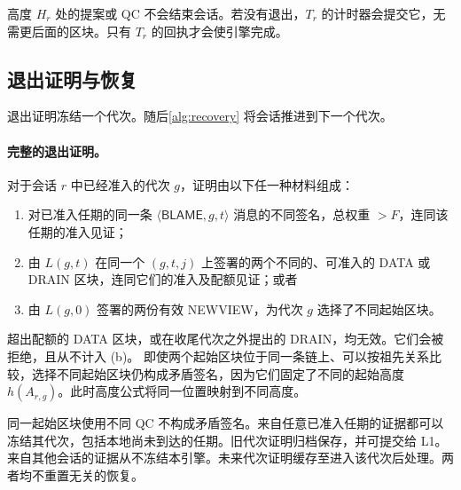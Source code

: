 \documentclass[11pt,a4paper]{article}
\newcommand{\RR}[1]{{\color{rrRed}#1}}
\newcommand{\tagg}[1]{\ensuremath{\mathsf{#1}}}
\begin{document}
高度 $H_r$ 处的提案或 QC 不会结束会话。若没有退出，$T_r$ 的计时器会提交它，无需更后面的区块。只有 $T_r$ 的回执才会使引擎完成。

\subsection{退出证明与恢复}\label{sec:quit}
退出证明冻结一个代次。随后\cref{alg:recovery} 将会话推进到下一个代次。

\paragraph{完整的退出证明。}
对于\RR{会话 $r$ 中}已经准入的代次 $g$，证明由以下任一种材料组成：
\begin{enumerate}[label=(\alph*)]
\item 对已准入任期的同一条 $\langle\tagg{BLAME},g,t\rangle$ 消息的不同签名\RR{，总权重 $>F$}，连同该任期的准入见证；
\item 由 $L(g,t)$ 在同一个 $(g,t,j)$ 上签署的两个不同的、可准入的 DATA \RR{或 DRAIN} 区块，连同它们的准入\RR{及配额}见证；或者
\item 由 $L(g,0)$ 签署的两份有效 NEWVIEW，为代次 $g$ 选择了不同起始区块。
\end{enumerate}
\RR{超出配额的 DATA 区块，或在收尾代次之外提出的 DRAIN，均无效。它们会被拒绝，且从不计入 (b)。}
即使两个起始区块位于同一条链上、可以按祖先关系比较，选择不同起始区块仍构成矛盾签名，因为它们固定了不同的起始高度 $h(A_{r,g})$。此时高度公式将同一位置映射到不同高度。

同一起始区块使用不同 QC 不构成矛盾签名。来自任意已准入任期的证据都可以冻结其代次，包括本地尚未到达的任期。旧代次证明归档保存，并可提交给 L1。\RR{来自其他会话的证据从不冻结本引擎。}未来代次证明缓存至进入该代次后处理。两者均不重置无关的恢复。
\end{document}
